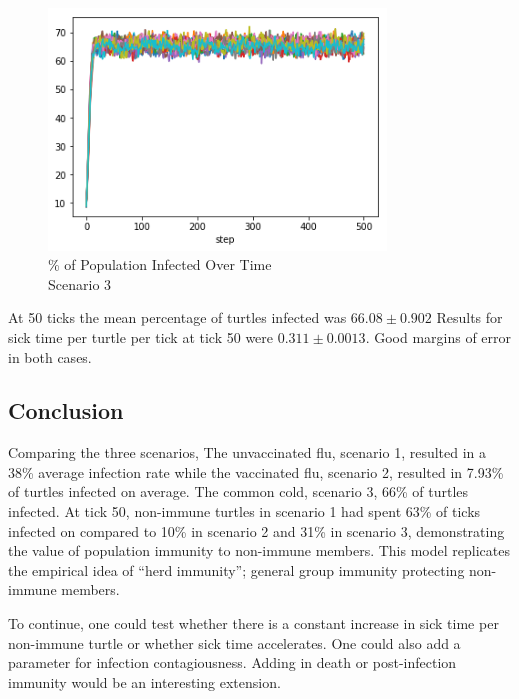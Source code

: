 \documentclass[11pt]{article} %
\begin{document}
\begin{figure}
\centering
\includegraphics[width=0.8\textwidth]{20-runs-scenario-3-steady-state}
\caption{\% of Population Infected Over Time \\ Scenario 3}
\end{figure}


At 50 ticks the mean percentage of turtles infected was $66.08 \pm 0.902$ Results for sick time per turtle per tick at tick 50 were $0.311 \pm 0.0013$. Good margins of error in both cases. 


\subsection{Conclusion}

Comparing the three scenarios, The unvaccinated flu, scenario 1, resulted in a 38\% average infection rate while the vaccinated flu, scenario 2, resulted in 7.93\% of turtles infected on average. The common cold, scenario 3,  66\% of turtles infected. At tick 50, non-immune turtles in scenario 1 had spent 63\% of ticks infected on compared to 10\% in scenario 2 and 31\% in scenario 3, demonstrating the value of population immunity to non-immune members.  This model replicates the empirical idea of ``herd immunity''; general group immunity protecting non-immune members. 

To continue, one could test whether there is a constant increase in sick time per non-immune turtle or whether  sick time accelerates. One could also add  a parameter for infection contagiousness. Adding in death or post-infection immunity would be an interesting extension. 

\end{document}
